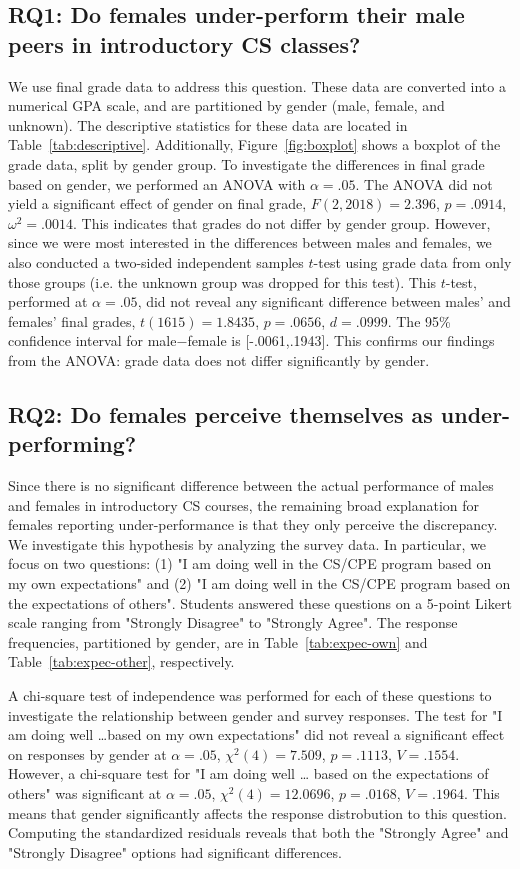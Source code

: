 \documentclass[a4paper,man,natbib]{apa6}
\begin{document}
\subsection{RQ1: Do females under-perform their male peers in introductory CS
classes?} We use final grade data to address this question. These data are
converted into a numerical GPA scale, and are partitioned by gender (male,
female, and unknown). The descriptive statistics for these data are located in
Table~\ref{tab:descriptive}. Additionally, Figure~\ref{fig:boxplot} shows a
boxplot of the grade data, split by gender group. To investigate the
differences in final grade based on gender, we performed an ANOVA with $\alpha
= .05$. The ANOVA did not yield a significant effect of gender on final grade,
$F(2,2018)=2.396$, $p=.0914$, $\omega^2=.0014$. This indicates that grades do
not differ by gender group. However, since we were most interested in the
differences between males and females, we also conducted a two-sided
independent samples $t$-test using grade data from only those groups (i.e. the
unknown group was dropped for this test). This $t$-test, performed at
$\alpha=.05$, did not reveal any significant difference between males' and
females' final grades, $t(1615)=1.8435$, $p=.0656$, $d=.0999$. The 95\%
confidence interval for male$-$female is [-.0061,.1943]. This confirms our
findings from the ANOVA: grade data does not differ significantly by gender.

\subsection{RQ2: Do females perceive themselves as under-performing?}
Since there is no significant difference between the actual performance of
males and females in introductory CS courses, the remaining broad explanation
for females reporting under-performance is that they only perceive the
discrepancy. We investigate this hypothesis by analyzing the survey data. In
particular, we focus on two questions: (1) "I am doing well in the CS/CPE
program based on my own expectations" and (2) "I am doing well in the CS/CPE
program based on the expectations of others". Students answered these questions
on a 5-point Likert scale ranging from "Strongly Disagree" to "Strongly Agree".
The response frequencies, partitioned by gender, are in
Table~\ref{tab:expec-own} and Table~\ref{tab:expec-other}, respectively. 

A chi-square test of independence was performed for each of these questions to
investigate the relationship between gender and survey responses. The test for
"I am doing well \dots based on my own expectations" did not reveal a
significant effect on responses by gender at $\alpha=.05$, $\chi^2(4)=7.509$,
$p=.1113$, $V=.1554$. However, a chi-square test for "I am doing well \dots
based on the expectations of others" was significant at $\alpha=.05$,
$\chi^2(4)=12.0696$, $p=.0168$, $V=.1964$. This means that gender significantly
affects the response distrobution to this question. Computing the standardized
residuals reveals that both the "Strongly Agree" and "Strongly Disagree"
options had significant differences. 
\end{document}
